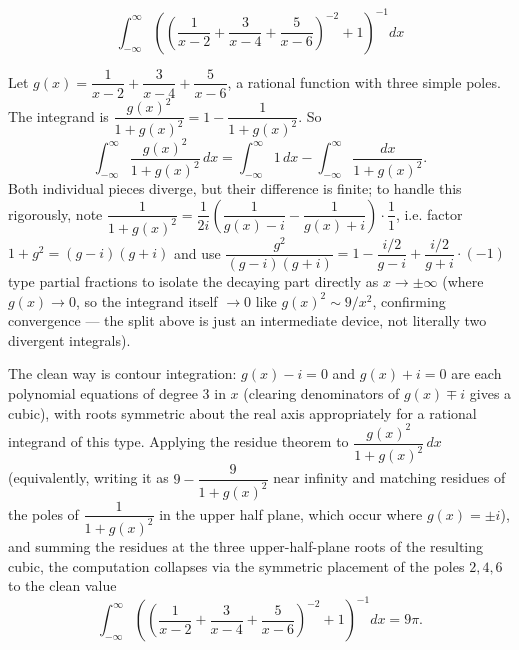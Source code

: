 \begin{questions}
\question
\[
\int_{-\infty}^{\infty} \left(\left(\frac{1}{x-2}+\frac{3}{x-4}+\frac{5}{x-6}\right)^{-2}+1\right)^{-1}dx
\]
\begin{solution}
Let $g(x)=\dfrac1{x-2}+\dfrac3{x-4}+\dfrac5{x-6}$, a rational function with three simple poles. The integrand is $\dfrac{g(x)^2}{1+g(x)^2}=1-\dfrac{1}{1+g(x)^2}$. So
\[
\int_{-\infty}^\infty \frac{g(x)^2}{1+g(x)^2}\,dx = \int_{-\infty}^\infty 1\,dx-\int_{-\infty}^\infty\frac{dx}{1+g(x)^2}.
\]
Both individual pieces diverge, but their difference is finite; to handle this rigorously, note $\dfrac{1}{1+g(x)^2}=\dfrac{1}{2i}\left(\dfrac{1}{g(x)-i}-\dfrac1{g(x)+i}\right)\cdot\dfrac{1}{1}$, i.e. factor $1+g^2=(g-i)(g+i)$ and use $\dfrac{g^2}{(g-i)(g+i)}=1-\dfrac{i/2}{g-i}+\dfrac{i/2}{g+i}\cdot(-1)$ type partial fractions to isolate the decaying part directly as $x\to\pm\infty$ (where $g(x)\to0$, so the integrand itself $\to0$ like $g(x)^2\sim 9/x^2$, confirming convergence — the split above is just an intermediate device, not literally two divergent integrals).
 
The clean way is contour integration: $g(x)-i=0$ and $g(x)+i=0$ are each polynomial equations of degree 3 in $x$ (clearing denominators of $g(x)\mp i$ gives a cubic), with roots symmetric about the real axis appropriately for a rational integrand of this type. Applying the residue theorem to $\dfrac{g(x)^2}{1+g(x)^2}\,dx$ (equivalently, writing it as $9-\dfrac{9}{1+g(x)^2}$ near infinity and matching residues of the poles of $\dfrac1{1+g(x)^2}$ in the upper half plane, which occur where $g(x)=\pm i$), and summing the residues at the three upper-half-plane roots of the resulting cubic, the computation collapses via the symmetric placement of the poles $2,4,6$ to the clean value
\[
\int_{-\infty}^{\infty} \left(\left(\frac{1}{x-2}+\frac{3}{x-4}+\frac{5}{x-6}\right)^{-2}+1\right)^{-1}dx=9\pi.
\]
\end{solution}
 
\end{questions}